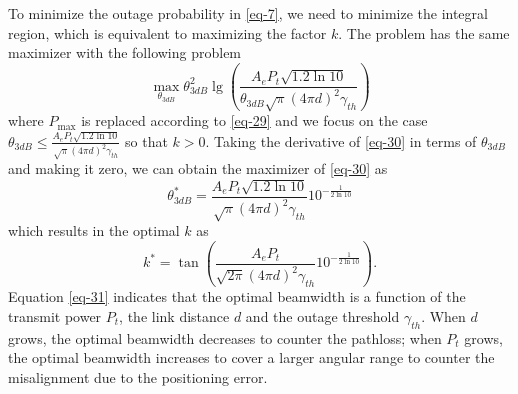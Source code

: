 \documentclass{IEEEtran}
\begin{document}
To minimize the outage probability in \eqref{eq-7}, we need to minimize the integral region, which is equivalent to maximizing the factor $k$. The problem has the same maximizer with the following problem
\begin{equation}\label{eq-30}
 \mathop {\max }\limits_{{\theta _{3dB}}} \theta _{3dB}^2\lg \left( {\frac{{{A_e}{P_t}\sqrt {1.2\ln 10} }}{{{\theta _{3dB}}\sqrt \pi  {{\left( {4\pi d} \right)}^2}{\gamma _{th}}}}} \right)
\end{equation}
where $P_{\max}$ is replaced according to \eqref{eq-29} and we focus on the case ${\theta _{3dB}} \le \frac{{{A_e}{P_t}\sqrt {1.2\ln 10} }}{{\sqrt \pi  {{\left( {4\pi d} \right)}^2}{\gamma _{th}}}}$ so that $k>0$. Taking the derivative of \eqref{eq-30} in terms of $\theta _{3dB}$ and making it zero, we can obtain the maximizer of \eqref{eq-30} as
\begin{equation}\label{eq-31}
\theta _{3dB}^* = \frac{{{A_e}{P_t}\sqrt {1.2\ln 10} }}{{\sqrt \pi  {{\left( {4\pi d} \right)}^2}{\gamma _{th}}}}{10^{ - \frac{1}{{2\ln 10}}}}
\end{equation}
which results in the optimal $k$ as
\begin{equation}\label{eq-32}
{k^*} = \tan \left( {\frac{{{A_e}{P_t}}}{{\sqrt {2\pi } {{\left( {4\pi d} \right)}^2}{\gamma _{th}}}}{{10}^{ - \frac{1}{{2\ln 10}}}}} \right).
\end{equation}
Equation \eqref{eq-31} indicates that the optimal beamwidth is a function of the transmit power $P_t$, the link distance $d$ and the outage threshold $\gamma_{th}$. When $d$ grows, the optimal beamwidth decreases to counter the pathloss; when $P_t$ grows, the optimal beamwidth increases to cover a larger angular range to counter the misalignment due to the positioning error.


\vspace{-5pt}
\end{document}
